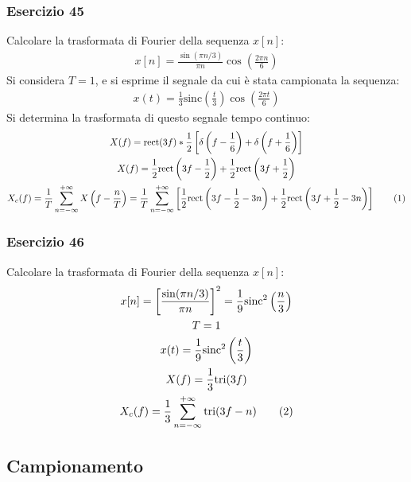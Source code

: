 \documentclass{article}
\newcommand{\rect}{\mathrm{rect}}
\newcommand{\sinc}{\mathrm{sinc}}
\newcommand{\tri}{\mathrm{tri}}
\newcommand{\tageq}{\tag{\stepcounter{equation}\theequation}}
\begin{document}
\subsubsection*{Esercizio 45}

Calcolare la trasformata di Fourier della sequenza $x[n]$:
\begin{gather*}
    x[n]=\displaystyle\frac{\sin(\pi n/3)}{\pi n}\cos\left(\frac{2\pi n}{6}\right)
\end{gather*}
Si considera $T=1$, e si esprime il segnale da cui è stata campionata la sequenza:
\begin{gather*}
    x(t)=\frac{1}{3}\sinc\left(\frac{t}{3}\right)\cos\left(\frac{2\pi t}{6}\right)
\end{gather*}
Si determina la trasformata di questo segnale tempo continuo:
\begin{gather*}
    X(f)=\displaystyle\rect(3f)*\frac{1}{2}\left[\delta\left(f-\frac{1}{6}\right)+\delta\left(f+\frac{1}{6}\right)\right]\\
    X(f)=\displaystyle\frac{1}{2}\rect\left(3f-\frac{1}{2}\right)+\frac{1}{2}\rect\left(3f+\frac{1}{2}\right)\\
    X_c(f)=\displaystyle\frac{1}{T}\sum_{n=-\infty}^{+\infty}X\left(f-\frac{n}{T}\right)=\frac{1}{T}\sum_{n=-\infty}^{+\infty}\left[\frac{1}{2}\rect\left(3f-\frac{1}{2}-3n\right)+\frac{1}{2}\rect\left(3f+\frac{1}{2}-3n\right)\right]\tageq
\end{gather*}

\subsubsection*{Esercizio 46}

Calcolare la trasformata di Fourier della sequenza $x[n]$:
\begin{gather*}
    x[n]=\left[\displaystyle\frac{\sin(\pi n/3)}{\pi n}\right]^2=\frac{1}{9}\sinc^2\left(\frac{n}{3}\right)\\
    T=1\\
    x(t)=\displaystyle\frac{1}{9}\sinc^2\left(\frac{t}{3}\right)\\
    X(f)=\displaystyle \frac{1}{3}\tri (3f)\\
    X_c(f)=\displaystyle\frac{1}{3}\sum_{n=-\infty}^{+\infty}\tri (3f-n)\tageq
\end{gather*}

\subsection{Campionamento}
\end{document}
